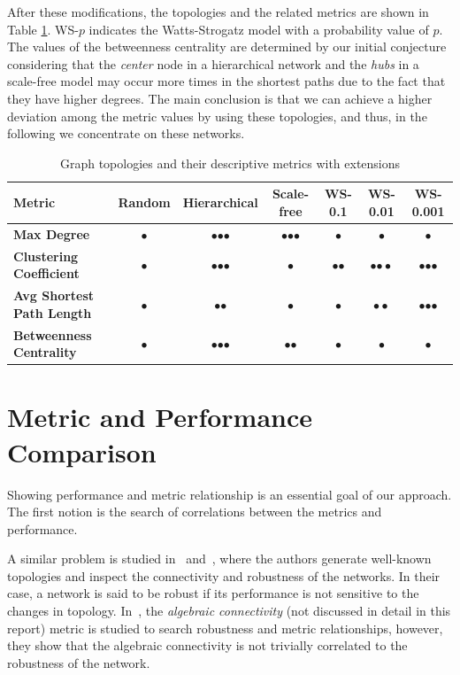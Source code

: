 After these modifications, the topologies and the related metrics are shown in Table \ref{tab:topology_metrics2}. WS-$p$ indicates the Watts-Strogatz model with a probability value of $p$. The values of the betweenness centrality are determined by our initial conjecture considering that the \textit{center} node in a hierarchical network and the \textit{hubs} in a scale-free model may occur more times in the shortest paths due to the fact that they have higher degrees. The main conclusion is that we can achieve a higher deviation among the metric values by using these topologies, and thus, in the following we concentrate on these networks.
\begin{table}[ht]
	\footnotesize
	\centering
	
	\begin{tabular}{ l c c c c c c}
		\toprule
		Metric & Random & Hierarchical & Scale-free & WS-0.1 & WS-0.01 & WS-0.001 \\ 
		\midrule 
		\textbf{Max Degree} & $\bullet$ & $\bullet$$\bullet$$\bullet$ & $\bullet$$\bullet$$\bullet$ & $\bullet$ & $\bullet$ & $\bullet$ \\ \hline
		\textbf{Clustering Coefficient} & $\bullet$ & $\bullet$$\bullet$$\bullet$ & $\bullet$ & $\bullet$$\bullet$ & $\bullet$$\bullet \bullet$ & $\bullet$$\bullet$$\bullet$\\ \hline
		\textbf{Avg Shortest Path Length} & $\bullet$ & $\bullet$$\bullet$ & $\bullet$ & $\bullet $ & $\bullet \bullet$ & $\bullet$$\bullet$$\bullet$\\ \hline
		\textbf{Betweenness Centrality} & $\bullet$ & $\bullet$$\bullet$$\bullet$ & $\bullet$$\bullet$ & $\bullet$ & $\bullet$ & $\bullet$\\ \hline
		\bottomrule
	\end{tabular}
	\caption{Graph topologies and their descriptive metrics with extensions}
	\label{tab:topology_metrics2}
\end{table}

\section{Metric and Performance Comparison}

Showing performance and metric relationship is an essential goal of our approach. The first notion is the search of correlations between the metrics and performance.

A similar problem is studied in~\cite{algebraic1} and~\cite{algebraic2}, where the authors generate well-known topologies and inspect the connectivity and robustness of the networks. In their case, a network is said to be robust if its performance is not sensitive to the changes in topology. In~\cite{algebraic1}, the \emph{algebraic connectivity} (not discussed in detail in this report) metric is studied to search robustness and metric relationships, however, they show that the algebraic connectivity is not trivially correlated to the robustness of the network.

